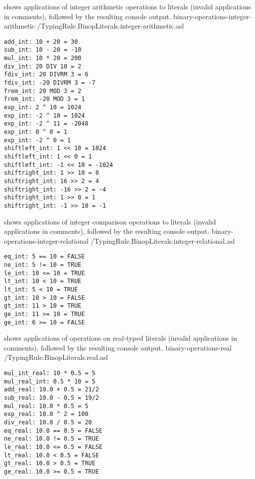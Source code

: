  shows applications
of integer arithmetic operations to literals (invalid applications in comments),
followed by the resulting console output.
  {binary-operations-integer-arithmetic}
  {\typingtests/TypingRule.BinopLiterals.integer-arithmetic.asl}

\begin{Verbatim}[fontsize=\footnotesize, frame=single]
add_int: 10 + 20 = 30
sub_int: 10 - 20 = -10
mul_int: 10 * 20 = 200
div_int: 20 DIV 10 = 2
fdiv_int: 20 DIVRM 3 = 6
fdiv_int: -20 DIVRM 3 = -7
frem_int: 20 MOD 3 = 2
frem_int: -20 MOD 3 = 1
exp_int: 2 ^ 10 = 1024
exp_int: -2 ^ 10 = 1024
exp_int: -2 ^ 11 = -2048
exp_int: 0 ^ 0 = 1
exp_int: -2 ^ 0 = 1
shiftleft_int: 1 << 10 = 1024
shiftleft_int: 1 << 0 = 1
shiftleft_int: -1 << 10 = -1024
shiftright_int: 1 >> 10 = 0
shiftright_int: 16 >> 2 = 4
shiftright_int: -16 >> 2 = -4
shiftright_int: 1 >> 0 = 1
shiftright_int: -1 >> 10 = -1
\end{Verbatim}

 shows applications
of integer comparison operations to literals (invalid applications in comments),
followed by the resulting console output.
  {binary-operations-integer-relational}
  {\typingtests/TypingRule.BinopLiterals.integer-relational.asl}

\begin{Verbatim}[fontsize=\footnotesize, frame=single]
eq_int: 5 == 10 = FALSE
ne_int: 5 != 10 = TRUE
le_int: 10 <= 10 = TRUE
lt_int: 10 < 10 = TRUE
lt_int: 5 < 10 = TRUE
gt_int: 10 > 10 = FALSE
gt_int: 11 > 10 = TRUE
ge_int: 11 >= 10 = TRUE
ge_int: 6 >= 10 = FALSE
\end{Verbatim}

 shows applications
of operations on real-typed literals (invalid applications in comments),
followed by the resulting console output.
  {binary-operations-real}
  {\typingtests/TypingRule.BinopLiterals.real.asl}

\begin{Verbatim}[fontsize=\footnotesize, frame=single]
mul_int_real: 10 * 0.5 = 5
mul_real_int: 0.5 * 10 = 5
add_real: 10.0 + 0.5 = 21/2
sub_real: 10.0 - 0.5 = 19/2
mul_real: 10.0 * 0.5 = 5
exp_real: 10.0 ^ 2 = 100
div_real: 10.0 / 0.5 = 20
eq_real: 10.0 == 0.5 = FALSE
ne_real: 10.0 != 0.5 = TRUE
le_real: 10.0 <= 0.5 = FALSE
lt_real: 10.0 < 0.5 = FALSE
gt_real: 10.0 > 0.5 = TRUE
ge_real: 10.0 >= 0.5 = TRUE
\end{Verbatim}


